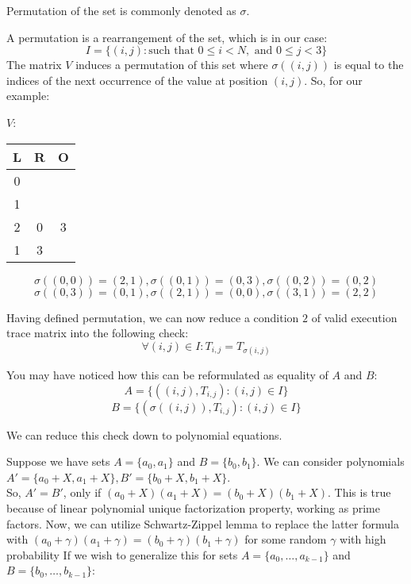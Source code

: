 \documentclass[../lecture-notes.tex]{subfiles}
\begin{document}
\begin{remark}
Permutation of the set is commonly denoted as $\sigma$.
\end{remark}

\begin{example}
A permutation is a rearrangement of the set, which is in our case: 
\[I = \{(i, j) : \text{such that } 0 \leq i < N, \text{ and } 0 \leq j < 3\}\]
The matrix $V$ induces a permutation of this set where $\sigma((i,j))$ is equal to the indices of the next occurrence of the value at position $(i,j)$. So, for our example:

\begin{center}
\quad $V$:
\begin{tabular}{|c|c|c|}
\hline
L & R & O \\
\hline
0 &  &  \\
\hline
1 &  &  \\
\hline
2 & 0 & 3 \\
\hline
1 & 3 &  \\
\hline
\end{tabular}
\end{center}

\[\sigma((0,0)) = (2,1), \sigma((0,1)) = (0,3), \sigma((0,2)) = (0,2)\]
\[\sigma((0,3)) = (0,1), \sigma((2,1)) = (0,0), \sigma((3,1)) = (2,2)\]
\end{example}

Having defined permutation, we can now reduce a condition $2$ of valid execution trace matrix into the following check:
\[\forall (i, j) \in I: T_{i,j} = T_{\sigma(i,j)}\]

You may have noticed how this can be reformulated as equality of $A$ and $B$:
\[A = \{((i, j), T_{i,j}) : (i, j) \in I\}\]
\[B = \{(\sigma((i, j)), T_{i,j}) : (i, j) \in I\}\]

We can reduce this check down to polynomial equations.

Suppose we have sets \(A = \{a_0, a_1\}\) and \(B = \{b_0, b_1\}\). We can consider polynomials \(A' = \{a_0 + X, a_1 + X\}, B' = \{b_0 + X, b_1 + X\}\). 
\\
So, \(A' = B'\), only if \((a_0 + X)(a_1 + X) = (b_0 + X)(b_1 + X)\). This is true because of linear polynomial unique factorization property, working as prime factors. Now, we can utilize Schwartz-Zippel lemma to replace the latter formula with \((a_0 + \gamma)(a_1 + \gamma) = (b_0 + \gamma)(b_1 + \gamma)\) for some random $\gamma$ with high probability
If we wish to generalize this for sets \(A = \{a_0, \ldots, a_{k-1}\}\) and \(B = \{b_0, \ldots, b_{k-1}\}\):
\end{document}

